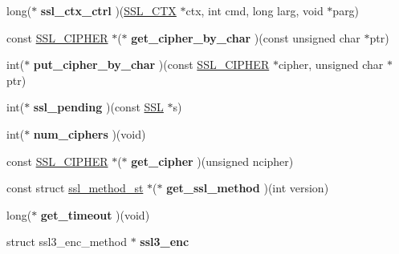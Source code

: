 \begin{DoxyCompactItemize}
long($\ast$ {\bfseries ssl\+\_\+ctx\+\_\+ctrl} )(\hyperlink{structssl__ctx__st}{S\+S\+L\+\_\+\+C\+TX} $\ast$ctx, int cmd, long larg, void $\ast$parg)
\item 
\mbox{\label{structssl__method__st_a51d27641af1ef292ad991acab889eb69}} 
const \hyperlink{structssl__cipher__st}{S\+S\+L\+\_\+\+C\+I\+P\+H\+ER} $\ast$($\ast$ {\bfseries get\+\_\+cipher\+\_\+by\+\_\+char} )(const unsigned char $\ast$ptr)
\item 
\mbox{\label{structssl__method__st_a625829ff35be4426d905e44ea04024cf}} 
int($\ast$ {\bfseries put\+\_\+cipher\+\_\+by\+\_\+char} )(const \hyperlink{structssl__cipher__st}{S\+S\+L\+\_\+\+C\+I\+P\+H\+ER} $\ast$cipher, unsigned char $\ast$ptr)
\item 
\mbox{\label{structssl__method__st_a8fd510a866d8754bfd60e897ccb8d3b4}} 
int($\ast$ {\bfseries ssl\+\_\+pending} )(const \hyperlink{structssl__st}{S\+SL} $\ast$s)
\item 
\mbox{\label{structssl__method__st_ad67301b9f432dca1d82eda0a2a73d402}} 
int($\ast$ {\bfseries num\+\_\+ciphers} )(void)
\item 
\mbox{\label{structssl__method__st_aa5b037fbac753dc98291d099d817a072}} 
const \hyperlink{structssl__cipher__st}{S\+S\+L\+\_\+\+C\+I\+P\+H\+ER} $\ast$($\ast$ {\bfseries get\+\_\+cipher} )(unsigned ncipher)
\item 
\mbox{\label{structssl__method__st_a601499546a57b7fc73461cca2588a316}} 
const struct \hyperlink{structssl__method__st}{ssl\+\_\+method\+\_\+st} $\ast$($\ast$ {\bfseries get\+\_\+ssl\+\_\+method} )(int version)
\item 
\mbox{\label{structssl__method__st_a5a153fd1d3f82198c14ceca526c07efa}} 
long($\ast$ {\bfseries get\+\_\+timeout} )(void)
\item 
\mbox{\label{structssl__method__st_aa9b5c4c60c391bc6771bd035aa10ce0a}} 
struct ssl3\+\_\+enc\+\_\+method $\ast$ {\bfseries ssl3\+\_\+enc}
\item 
\mbox{\label{structssl__method__st_a84b47953e71129319b367394a6daca4b}} 

\end{DoxyCompactItemize}
